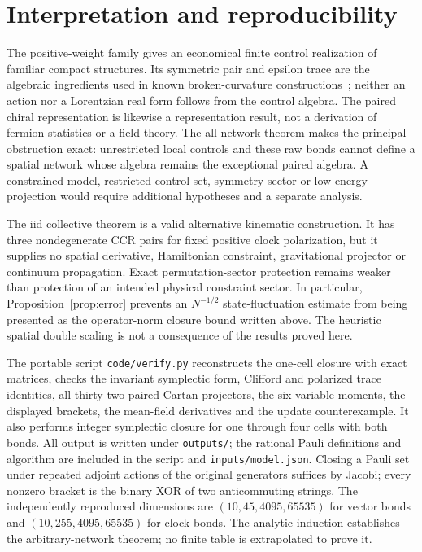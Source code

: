 \documentclass[11pt]{article}
\theoremstyle{remark}\newtheorem{remark}[theorem]{Remark}
\begin{document}
\section{Interpretation and reproducibility}
The positive-weight family gives an economical finite control realization of familiar compact structures.
Its symmetric pair and epsilon trace are the algebraic ingredients used in known broken-curvature constructions~\cite{MacDowell1977,Wise2010}; neither an action nor a Lorentzian real form follows from the control algebra.
The paired chiral representation is likewise a representation result, not a derivation of fermion statistics or a field theory.
The all-network theorem makes the principal obstruction exact: unrestricted local controls and these raw bonds cannot define a spatial network whose algebra remains the exceptional paired algebra.
A constrained model, restricted control set, symmetry sector or low-energy projection would require additional hypotheses and a separate analysis.

The iid collective theorem is a valid alternative kinematic construction.
It has three nondegenerate CCR pairs for fixed positive clock polarization, but it supplies no spatial derivative, Hamiltonian constraint, gravitational projector or continuum propagation.
Exact permutation-sector protection remains weaker than protection of an intended physical constraint sector.
In particular, Proposition~\ref{prop:error} prevents an $N^{-1/2}$ state-fluctuation estimate from being presented as the operator-norm closure bound written above.
The heuristic spatial double scaling is not a consequence of the results proved here.

The portable script \texttt{code/verify.py} reconstructs the one-cell closure with exact matrices, checks the invariant symplectic form, Clifford and polarized trace identities, all thirty-two paired Cartan projectors, the six-variable moments, the displayed brackets, the mean-field derivatives and the update counterexample.
It also performs integer symplectic closure for one through four cells with both bonds.
All output is written under \texttt{outputs/}; the rational Pauli definitions and algorithm are included in the script and \texttt{inputs/model.json}.
Closing a Pauli set under repeated adjoint actions of the original generators suffices by Jacobi; every nonzero bracket is the binary XOR of two anticommuting strings.
The independently reproduced dimensions are $(10,45,4095,65535)$ for vector bonds and $(10,255,4095,65535)$ for clock bonds.
The analytic induction establishes the arbitrary-network theorem; no finite table is extrapolated to prove it.
\end{document}

